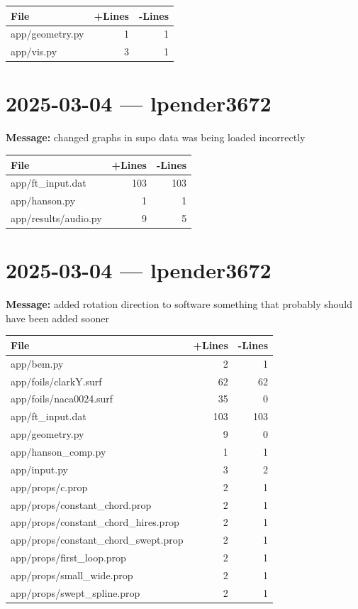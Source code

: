 \documentclass{article}
\begin{document}
\begin{longtable}{|p{10cm}|r|r|}
\hline \textbf{File} & \textbf{+Lines} & \textbf{-Lines} \\
\hline
app/geometry.py & 1 & 1 \\
\hline
app/vis.py & 3 & 1 \\
\hline
\end{longtable}

\section*{2025-03-04 --- lpender3672}
\textbf{Message:} changed graphs in supo data was being loaded incorrectly

\begin{longtable}{|p{10cm}|r|r|}
\hline \textbf{File} & \textbf{+Lines} & \textbf{-Lines} \\
\hline
app/ft\_input.dat & 103 & 103 \\
\hline
app/hanson.py & 1 & 1 \\
\hline
app/results/audio.py & 9 & 5 \\
\hline
\end{longtable}

\section*{2025-03-04 --- lpender3672}
\textbf{Message:} added rotation direction to software something that probably should have been added sooner

\begin{longtable}{|p{10cm}|r|r|}
\hline \textbf{File} & \textbf{+Lines} & \textbf{-Lines} \\
\hline
app/bem.py & 2 & 1 \\
\hline
app/foils/clarkY.surf & 62 & 62 \\
\hline
app/foils/naca0024.surf & 35 & 0 \\
\hline
app/ft\_input.dat & 103 & 103 \\
\hline
app/geometry.py & 9 & 0 \\
\hline
app/hanson\_comp.py & 1 & 1 \\
\hline
app/input.py & 3 & 2 \\
\hline
app/props/c.prop & 2 & 1 \\
\hline
app/props/constant\_chord.prop & 2 & 1 \\
\hline
app/props/constant\_chord\_hires.prop & 2 & 1 \\
\hline
app/props/constant\_chord\_swept.prop & 2 & 1 \\
\hline
app/props/first\_loop.prop & 2 & 1 \\
\hline
app/props/small\_wide.prop & 2 & 1 \\
\hline
app/props/swept\_spline.prop & 2 & 1 \\
\hline
\end{longtable}
\end{document}
